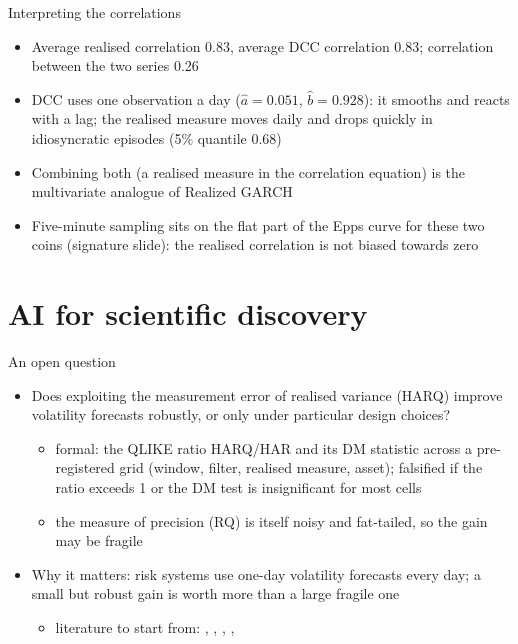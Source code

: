 \begin{frame}{Interpreting the correlations}
\itemsize{\small}
\begin{itemize}
    \item Average realised correlation 0.83, average DCC correlation 0.83; correlation between the two series 0.26
    \item DCC uses one observation a day ($\hat a = 0.051$, $\hat b = 0.928$): it smooths and reacts with a lag; the realised measure moves daily and drops quickly in idiosyncratic episodes (5\% quantile 0.68)
    \item Combining both (a realised measure in the correlation equation) is the multivariate analogue of Realized GARCH
    \item Five-minute sampling sits on the flat part of the Epps curve for these two coins (signature slide): the realised correlation is not biased towards zero
\end{itemize}
\end{frame}


\section{AI for scientific discovery}

\begin{frame}{An open question}
\itemsize{\small}
\begin{itemize}
    \item Does exploiting the measurement error of realised variance (HARQ) improve volatility forecasts robustly, or only under particular design choices?
    \begin{itemize}
        \item formal: the QLIKE ratio HARQ/HAR and its DM statistic across a pre-registered grid (window, filter, realised measure, asset); falsified if the ratio exceeds 1 or the DM test is insignificant for most cells
        \item the measure of precision (RQ) is itself noisy and fat-tailed, so the gain may be fragile
    \end{itemize}
    \item Why it matters: risk systems use one-day volatility forecasts every day; a small but robust gain is worth more than a large fragile one
    \begin{itemize}
        \item literature to start from: , , , , 
    \end{itemize}
\end{itemize}
\end{frame}

